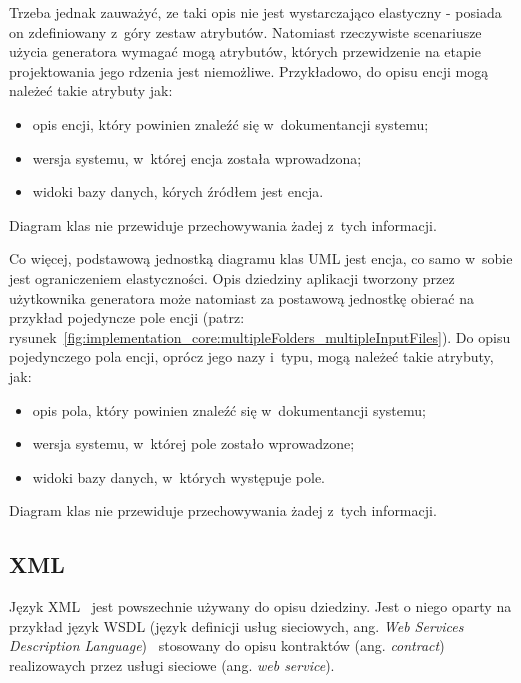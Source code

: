 

Trzeba jednak zauważyć, ze taki opis nie jest wystarczająco elastyczny - posiada on zdefiniowany z~góry zestaw atrybutów.
Natomiast rzeczywiste scenariusze użycia generatora wymagać mogą atrybutów, których przewidzenie na etapie projektowania jego rdzenia jest niemożliwe.
Przykładowo, do opisu encji mogą należeć takie atrybuty jak:

\begin{itemize}
 \item opis encji, który powinien znaleźć się w~dokumentancji systemu;
 \item wersja systemu, w~której encja została wprowadzona;
 \item widoki bazy danych, kórych źródłem jest encja.
\end{itemize}

Diagram klas nie przewiduje przechowywania żadej z~tych informacji.

Co więcej, podstawową jednostką diagramu klas UML jest encja, co samo w~sobie jest ograniczeniem elastyczności.
Opis dziedziny aplikacji tworzony przez użytkownika generatora może natomiast za postawową jednostkę obierać na przykład pojedyncze pole encji (patrz: rysunek~\ref{fig:implementation_core:multipleFolders_multipleInputFiles}).
Do opisu pojedynczego pola encji, oprócz jego nazy i~typu, mogą należeć takie atrybuty, jak:

\begin{itemize}
 \item opis pola, który powinien znaleźć się w~dokumentancji systemu;
 \item wersja systemu, w~której pole zostało wprowadzone;
 \item widoki bazy danych, w~których występuje pole.
\end{itemize}

Diagram klas nie przewiduje przechowywania żadej z~tych informacji.


\subsection{XML}

Język XML~\cite{xml} jest powszechnie używany do opisu dziedziny.
Jest o niego oparty na przykład język WSDL (język definicji usług sieciowych, ang. \emph{Web Services Description Language})~\cite{wsdl} stosowany do opisu kontraktów (ang. \emph{contract}) realizowaych przez usługi sieciowe (ang. \emph{web service}).

